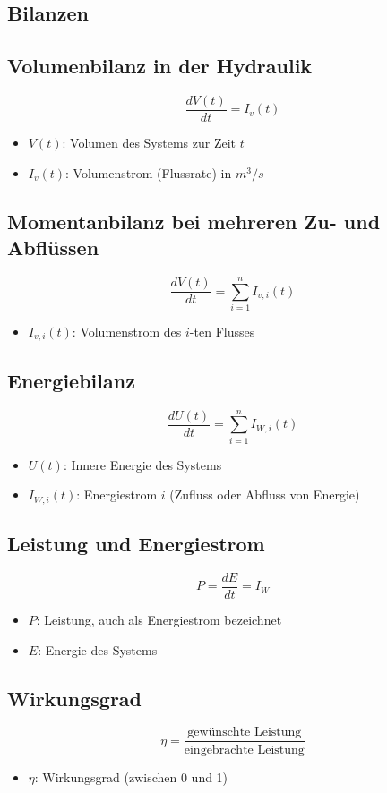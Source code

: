 \documentclass[a4paper, 8pt]{extarticle}
\begin{document}
\begin{landscape}
\begin{multicols*}{3}
\section{Bilanzen}

\subsection{Volumenbilanz in der Hydraulik}
\[
\frac{dV(t)}{dt} = I_v(t)
\]
\begin{itemize}
    \item \( V(t) \): Volumen des Systems zur Zeit \( t \)
    \item \( I_v(t) \): Volumenstrom (Flussrate) in \( m^3/s \)
\end{itemize}

\subsection{Momentanbilanz bei mehreren Zu- und Abflüssen}
\[
\frac{dV(t)}{dt} = \sum_{i=1}^n I_{v,i}(t)
\]
\begin{itemize}
    \item \( I_{v,i}(t) \): Volumenstrom des \( i \)-ten Flusses
\end{itemize}

\subsection{Energiebilanz}
\[
\frac{dU(t)}{dt} = \sum_{i=1}^n I_{W,i}(t)
\]
\begin{itemize}
    \item \( U(t) \): Innere Energie des Systems
    \item \( I_{W,i}(t) \): Energiestrom \( i \) (Zufluss oder Abfluss von Energie)
\end{itemize}

\subsection{Leistung und Energiestrom}
\[
P = \frac{dE}{dt} = I_W
\]
\begin{itemize}
    \item \( P \): Leistung, auch als Energiestrom bezeichnet
    \item \( E \): Energie des Systems
\end{itemize}

\subsection{Wirkungsgrad}
\[
\eta = \frac{\text{gewünschte Leistung}}{\text{eingebrachte Leistung}}
\]
\begin{itemize}
    \item \( \eta \): Wirkungsgrad (zwischen 0 und 1)
\end{itemize}


\end{multicols*}
\end{landscape}
\end{document}
